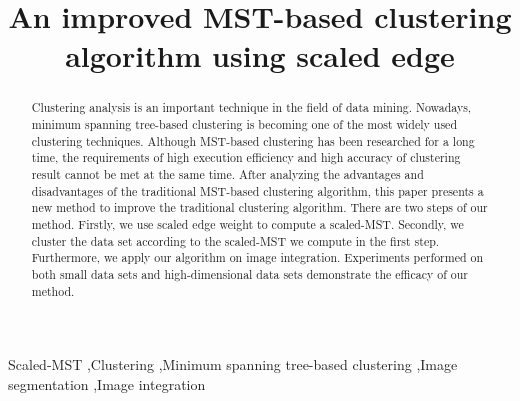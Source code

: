 
\begin{frontmatter}
	\title{An improved MST-based clustering algorithm using scaled edge}
	\begin{abstract}
		Clustering analysis is an important technique in the field of data mining. Nowadays, minimum spanning tree-based clustering is becoming one of the most widely used clustering techniques. Although MST-based clustering has been researched for a long time, the requirements of high execution efficiency and high accuracy of clustering result cannot be met at the same time. After analyzing the advantages and disadvantages of the traditional MST-based clustering algorithm, this paper presents a new method to improve the traditional clustering algorithm. There are two steps of our method. Firstly, we use scaled edge weight to compute a scaled-MST. Secondly, we cluster the data set according to the scaled-MST we compute in the first step. Furthermore, we apply our algorithm on image integration. Experiments performed on both small data sets and high-dimensional data sets demonstrate the efficacy of our method.
	\end{abstract}
	\begin{keyword}
		Scaled-MST \sep Clustering \sep Minimum spanning tree-based clustering \sep Image segmentation \sep Image integration 
	\end{keyword}
\end{frontmatter}
